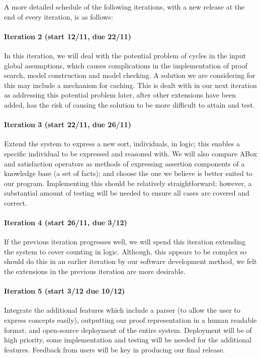 A more detailed schedule of the following iterations, with a new release at the end of every iteration, is as follows:
\paragraph{Iteration 2 (start 12/11, due 22/11)} In this iteration, we will deal with the potential problem of cycles in the input global assumptions, which causes complications in the implementation of proof search, model construction and model checking. A solution we are considering for this may include a mechanism for caching. This is dealt with in our next iteration as addressing this potential problem later, after other extensions have been added, has the risk of causing the solution to be more difficult to attain and test.
\paragraph{Iteration 3 (start 22/11, due 26/11)} Extend the system to express a new sort, individuals, in logic; this enables a specific individual to be expressed and reasoned with. We will also compare ABox and satisfaction operators as methods of expressing assertion components of a knowledge base (a set of facts); and choose the one we believe is better suited to our program. Implementing this should be relatively straightforward; however, a substantial amount of testing will be needed to ensure all cases are covered and correct.
\paragraph{Iteration 4 (start 26/11, due 3/12)} If the previous iteration progresses well, we will spend this iteration extending the system to cover counting in logic. Although, this appears to be complex so should do this in an earlier iteration by our software development method, we felt the extensions in the previous iteration are more desirable.
\paragraph{Iteration 5 (start 3/12 due 10/12)} Integrate the additional features which include a parser (to allow the user to express concepts easily), outputting our proof representation in a human readable format, and open-source deployment of the entire system. Deployment will be of high priority, some implementation and testing will be needed for the additional features. Feedback from users will be key in producing our final release.
